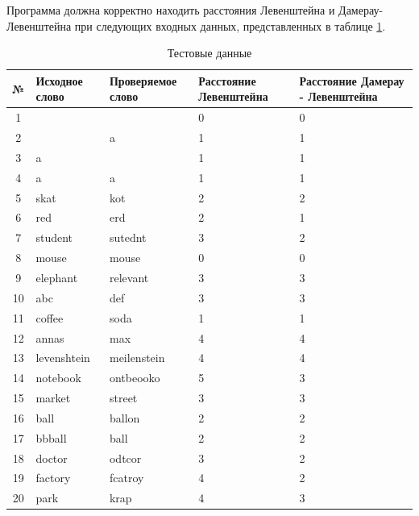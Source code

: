 \documentclass[a4paper,12pt]{article}
\begin{document}
    Программа должна корректно находить расстояния Левенштейна и Дамерау-Левенштейна при следующих входных данных, представленных в таблице \ref{table:test_data_table}.\\
    \begin{table} [h!]
    \begin{center}
    \caption{Тестовые данные} 
    \begin{tabular}{|c|p{3.5cm}|p{3.5cm}|p{3.5cm}|p{3.5cm}|}
    	\hline
    	№ & Исходное слово & Проверяемое слово & Расстояние Левенштейна & Расстояние Дамерау - Левенштейна\\
    	\hline
    	1 & \diameter & \diameter & 0 & 0  \\
    	\hline
    	2 & \diameter & a & 1 & 1  \\
    	\hline
    	3 & a & \diameter & 1 & 1  \\
    	\hline
    	4 & a & a & 1 & 1  \\
    	\hline
    	5 & skat & kot & 2 & 2  \\
    	\hline
    	6 & red & erd & 2 & 1  \\
    	\hline
    	7 & student & sutednt & 3 & 2  \\
    	\hline
    	8 & mouse & mouse & 0 & 0  \\
    	\hline
    	9 & elephant & relevant & 3 & 3  \\
    	\hline
    	10 & abc & def & 3 & 3  \\
    	\hline
    	11 & coffee & soda & 1 & 1  \\
    	\hline
    	12 & annas & max & 4 & 4  \\
    	\hline
    	13 & levenshtein & meilenstein & 4 & 4  \\
    	\hline
    	14 & notebook & ontbeooko & 5 & 3  \\
    	\hline
    	15 & market & street & 3 & 3  \\
    	\hline
    	16 & ball & ballon & 2 & 2  \\
    	\hline
    	17 & bbball & ball & 2 & 2  \\
    	\hline
    	18 & doctor & odtcor & 3 & 2  \\
    	\hline
    	19 & factory & fcatroy & 4 & 2  \\
    	\hline
    	20 & park & krap & 4 & 3  \\
    	\hline
    \end{tabular} \\

    \label{table:test_data_table}
    \end{center}
    \end{table}
    
\end{document}
